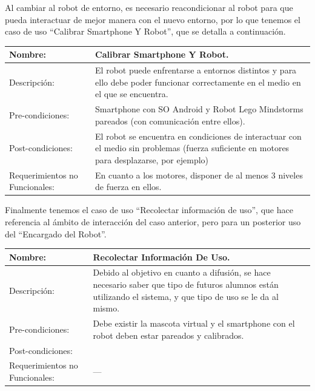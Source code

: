 \documentclass[letterpaper,12pt]{article} %
\numberwithin{equation}{section} %
\numberwithin{figure}{section} %
\numberwithin{table}{section} %
\begin{document}
Al cambiar al robot de entorno, es necesario reacondicionar al robot para que pueda interactuar de mejor manera con el nuevo entorno, por lo que tenemos el caso de uso ``Calibrar Smartphone Y Robot'', que se detalla a continuaci\'on.\\

\begin{table}[H]
  \centering
  \begin{tabular}{p{5cm}p{9cm}}\hline\hline
    Nombre: & Calibrar Smartphone Y Robot. \\ \hline
    Descripci\'on: & El robot puede enfrentarse a entornos distintos y para ello debe poder funcionar correctamente en el medio en el que se encuentra.\\\hline
    Pre-condiciones: & Smartphone con SO Android y Robot Lego Mindstorms pareados (con comunicaci\'on entre ellos).\\ \hline
    Post-condiciones: & El robot se encuentra en condiciones de interactuar con el medio sin problemas (fuerza suficiente en motores para desplazarse, por ejemplo)\\\hline
    Requerimientos no Funcionales: & En cuanto a los motores, disponer de al menos 3 niveles de fuerza en ellos.\\ \hline\hline %
  \end{tabular}
  \label{tab:Calibrar}
\end{table}


Finalmente tenemos el caso de uso ``Recolectar informaci\'on de uso'', que hace referencia al \'ambito de interacci\'on del caso anterior, pero para un posterior uso del ``Encargado del Robot''.\\

\begin{table}[H]
  \centering
  \begin{tabular}{p{5cm}p{9cm}}\hline\hline
    Nombre: & Recolectar Informaci\'on De Uso.\\ \hline
    Descripci\'on: & Debido al objetivo en cuanto a difusi\'on, se hace necesario saber que tipo de futuros alumnos est\'an utilizando el sistema, y que tipo de uso se le da al mismo.\\ \hline %
    Pre-condiciones: & Debe existir la mascota virtual y el smartphone con el robot deben estar pareados y calibrados.\\ \hline
    Post-condiciones: & \\ \hline
    Requerimientos no Funcionales: & ---\\ \hline\hline %
  \end{tabular}
  \label{tab:Recolectar}
\end{table}
\end{document}
